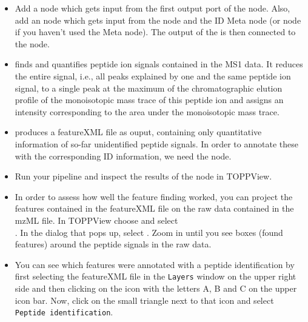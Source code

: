 \begin{itemize}
\item
Add a  node  which gets input from the first output port of the  node. Also, add an  node  which gets input from the  node and the ID Meta node (or  node if you haven't used the Meta node).
The output of the  is then connected to the  node.
\item
{} finds and quantifies peptide ion signals contained in the MS1 data.
It reduces the entire signal, i.e., all peaks explained by one and the same peptide ion signal, to a single peak at the maximum of the chromatographic elution profile of the monoisotopic mass trace of this peptide ion and assigns an intensity corresponding to the area under the monoisotopic mass trace.
\item
{} produces a featureXML file as ouput, containing only quantitative information of so-far unidentified peptide signals.
In order to annotate these with the corresponding ID information, we need the  node.
\item Run your pipeline and inspect the results of the  node in TOPPView.
\item In order to assess how well the feature finding worked, you can project the features contained in the featureXML file on the raw data contained in the mzML file.
In TOPPView choose  and select \\ .
In the dialog that pops up, select .
Zoom in until you see boxes (found features) around the peptide signals in the raw data.
\item
You can see which features were annotated with a peptide identification by first selecting the featureXML file in the \texttt{Layers} window on the upper right side and then clicking on the icon with the letters A, B and C on the upper icon bar.
Now, click on the small triangle next to that icon and select \texttt{Peptide identification}.
\end{itemize}

